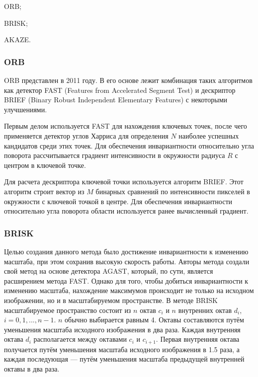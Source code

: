 %
\begin{itemize*}
  \item ORB;
  \item BRISK;
  \item AKAZE.
\end{itemize*}
%

\subsubsection{ORB}

ORB представлен в 2011 году\cite{twentytwo}. В его основе лежит комбинация таких алгоритмов как детектор FAST (Features from Accelerated Segment Test) и дескриптор BRIEF (Binary Robust Independent Elementary Features) с некоторыми улучшениями. 

Первым делом используется FAST для нахождения ключевых точек, после чего применяется детектор углов Харриса для определения \(N\) наиболее успешных кандидатов среди этих точек. Для обеспечения инвариантности относительно угла поворота рассчитывается градиент интенсивности в окружности радиуса \(R\) с центром в ключевой точке.

Для расчета дескриптора ключевой точки используется алгоритм BRIEF. Этот алгоритм строит вектор из \(M\) бинарных сравнений по интенсивности пикселей в окружности с ключевой точкой в центре. Для обеспечения инвариантности относительно угла поворота области используется ранее вычисленный градиент.

\subsubsection{BRISK}

Целью создания данного метода было достижение инвариантности к изменению масштаба, при этом сохранив высокую скорость работы. Авторы метода создали свой метод на основе детектора AGAST, который, по сути, является расширением метода FAST\cite{twentytwo}. Однако для того, чтобы добиться инвариантности к изменению масштаба, нахождение максимумов происходит не только на исходном изображении, но и в масштабируемом пространстве. В методе BRISK масштабируемое пространство состоит из \(n\) октав \(c_i\) и \(n\) внутренних октав \(d_i\), \(i = {0, 1, ..., n-1}\). \(n\) обычно выбирается равным 4. Октавы составляются путём уменьшения масштаба исходного изображения в два раза. Каждая внутренняя октава \(d_i\) располагается между октавами \(c_i\) и \(c_{i+1}\). Первая внутренняя октава получается путём уменьшения масштаба исходного изображения в 1.5 раза, а каждая последующая — путём уменьшения масштаба предыдущей внутренней октавы в два раза.

